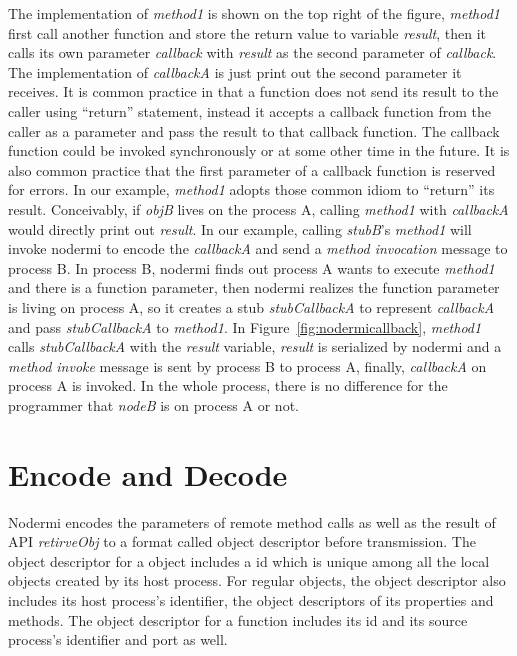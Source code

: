 The implementation of \emph{method1} is shown on the top right of the figure,
\emph{method1} first call another function and store the return value to variable \emph{result}, 
then it calls its own parameter \emph{callback} with \emph{result} as the second parameter
of \emph{callback}.
The implementation of \emph{callbackA} is just print out the second parameter it receives.
It is common practice in \js{} that a function does not send its result to the caller using ``return'' 
statement,
instead it accepts a callback function from the caller as a parameter 
and pass the result to that callback function.
The callback function could be invoked synchronously or at some other time in the future.
It is also  
common practice that the first parameter of a callback function is reserved for errors.
In our example, \emph{method1} adopts those common idiom to ``return'' its result.
Conceivably, if \emph{objB} lives on the process A, calling \emph{method1} with
\emph{callbackA} would directly print out \emph{result}.
In our example, calling \emph{stubB}'s \emph{method1} will invoke nodermi to 
encode the \emph{callbackA} and send a \emph{method invocation} message to process B.
In process B, nodermi finds out process A wants to execute \emph{method1} and
there is a function parameter, 
then nodermi realizes the function parameter is living on process A,
so it creates a stub \emph{stubCallbackA} to represent \emph{callbackA} and pass
\emph{stubCallbackA} to \emph{method1}.
In Figure~\ref{fig:nodermicallback}, 
\emph{method1} calls \emph{stubCallbackA} with the \emph{result} variable,
\emph{result} is serialized by nodermi and a \emph{method invoke} message is sent
by process B to process A, finally, \emph{callbackA} on process A is invoked.
In the whole process, there is no difference for the programmer that \emph{nodeB}
is on process A or not.

\section{Encode and Decode}

Nodermi encodes the parameters of remote method calls as well as
the result of API \emph{retirveObj} to a format called object descriptor
before transmission.
The object descriptor for a object includes a id which is unique
among all the local objects created by its host process.
For regular objects, the object descriptor also includes
its host process's identifier, the object descriptors of its properties and methods.
The object descriptor for a function includes
its id and its source process's identifier and port as well.

